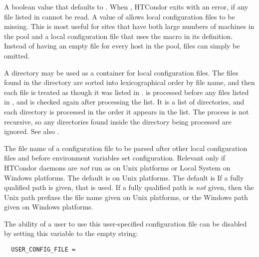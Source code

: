 \begin{description}
\label{param:RequireLocalConfigFile}
\item[\Macro{REQUIRE\_LOCAL\_CONFIG\_FILE}]
  A boolean value that defaults to .
  When , HTCondor exits with an error,
  if any file listed in  cannot be read.
  A value of  allows local configuration files to be missing.
  This is most useful for sites that have 
  both large numbers of machines in the pool and a local configuration file
  that uses the  macro in its definition.
  Instead of having an empty file for every host
  in the pool, files can simply be omitted.

\label{param:LocalConfigDir} 
\item[\Macro{LOCAL\_CONFIG\_DIR}]
  A directory may be used as a container for local configuration files. 
  The files found in the directory are sorted into lexicographical order 
  by file name, and 
  then each file is treated as though it was listed in 
  . 
   is processed before any files listed in 
  , and is checked again after processing
  the  list. 
  It is a list of directories, and each directory is processed in the order
  it appears in the list. 
  The process is not recursive, so any directories found inside the directory
  being processed are ignored. 
  See also .

\label{param:UserConfigFile} 
\item[\Macro{USER\_CONFIG\_FILE}]
  The file name of a configuration file to be parsed after other
  local configuration files and before environment variables set configuration.
  Relevant only if HTCondor daemons are \emph{not} run as 
  on Unix platforms or Local System on Windows platforms. 
  The default is  on Unix platforms.
  The default is \verb@%USERPROFILE\.condor\user_config@ on Windows platforms.
  If a fully qualified path is given, that is used.
  If a fully qualified path is \emph{not} given, 
  then the Unix path  prefixes the file name
  given on Unix platforms,
  or the Windows path \verb@%USERPROFILE\.condor\@ prefixes the file name
  given on Windows platforms.

  The ability of a user to use this user-specified configuration file 
  can be disabled by setting this variable to the empty string:
\begin{verbatim}
  USER_CONFIG_FILE =
\end{verbatim}


\end{description}
